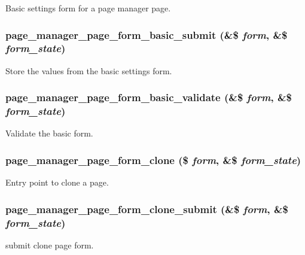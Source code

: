 \label{page_8admin_8inc_a152056d6f47d7a9d2a28e6f906ff35b1}
Basic settings form for a page manager page. \hypertarget{page_8admin_8inc_a576b9e7683f6f4d8dd2bef833a16c8b9}{
\subsubsection[{page\_\-manager\_\-page\_\-form\_\-basic\_\-submit}]{\setlength{\rightskip}{0pt plus 5cm}page\_\-manager\_\-page\_\-form\_\-basic\_\-submit (\&\$ {\em form}, \/  \&\$ {\em form\_\-state})}}
\label{page_8admin_8inc_a576b9e7683f6f4d8dd2bef833a16c8b9}
Store the values from the basic settings form. \hypertarget{page_8admin_8inc_a07e14f2811aa3135e2f53d9c044a1bcc}{
\subsubsection[{page\_\-manager\_\-page\_\-form\_\-basic\_\-validate}]{\setlength{\rightskip}{0pt plus 5cm}page\_\-manager\_\-page\_\-form\_\-basic\_\-validate (\&\$ {\em form}, \/  \&\$ {\em form\_\-state})}}
\label{page_8admin_8inc_a07e14f2811aa3135e2f53d9c044a1bcc}
Validate the basic form. \hypertarget{page_8admin_8inc_a5f2f6313e319f2b6ab6a9a0045ec6e4f}{
\subsubsection[{page\_\-manager\_\-page\_\-form\_\-clone}]{\setlength{\rightskip}{0pt plus 5cm}page\_\-manager\_\-page\_\-form\_\-clone (\$ {\em form}, \/  \&\$ {\em form\_\-state})}}
\label{page_8admin_8inc_a5f2f6313e319f2b6ab6a9a0045ec6e4f}
Entry point to clone a page. \hypertarget{page_8admin_8inc_a57a36bfa00a3c056b119c41acc030d16}{
\subsubsection[{page\_\-manager\_\-page\_\-form\_\-clone\_\-submit}]{\setlength{\rightskip}{0pt plus 5cm}page\_\-manager\_\-page\_\-form\_\-clone\_\-submit (\&\$ {\em form}, \/  \&\$ {\em form\_\-state})}}
\label{page_8admin_8inc_a57a36bfa00a3c056b119c41acc030d16}
submit clone page form.

